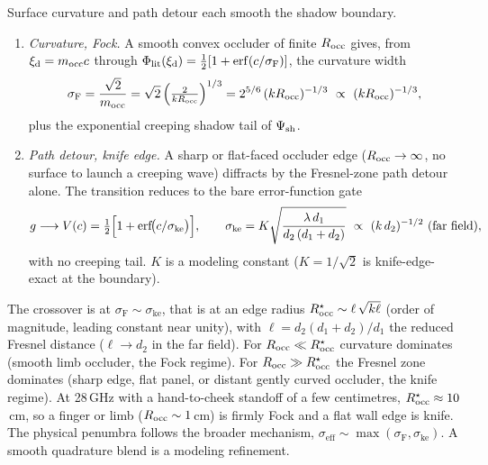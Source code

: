 \begin{proposition}\label{prop:knife}
Surface curvature and path detour each smooth the shadow boundary.
\begin{enumerate}
  \item \emph{Curvature, Fock.} A smooth convex occluder of finite $R_{\mathrm{occ}}$ gives,
    from $\xi_{\mathrm d}=m_{\mathrm{occ}}c$ through
    $\Philit(\xi_{\mathrm d})=\half[1+\erf(\clr/\sigma_{\mathrm{F}})]$, the
    curvature width
    \begin{equation}\label{eq:sigma-fock}
      \sigma_{\mathrm{F}} = \frac{\sqrt2}{m_{\mathrm{occ}}}
      = \sqrt2\,\Bigl(\tfrac{2}{kR_{\mathrm{occ}}}\Bigr)^{1/3}
      = 2^{5/6}\,(kR_{\mathrm{occ}})^{-1/3}
      \ \propto\ (kR_{\mathrm{occ}})^{-1/3},
    \end{equation}
    plus the exponential creeping shadow tail of $\Psi_{\mathrm{sh}}$.
  \item \emph{Path detour, knife edge.} A sharp or flat-faced occluder edge
    ($R_{\mathrm{occ}}\to\infty$, no surface to launch a creeping wave) diffracts by the
    Fresnel-zone path detour alone. The transition reduces to the bare
    error-function gate
    \begin{equation}\label{eq:knife-gate}
      g \longrightarrow V(\clr) = \half\Bigl[1+\erf\!\bigl(\clr/\sigma_{\mathrm{ke}}\bigr)\Bigr],
      \qquad
      \sigma_{\mathrm{ke}} = K\sqrt{\frac{\lambda\,d_1}{d_2\,(d_1+d_2)}}
      \ \propto\ (k\,d_2)^{-1/2}\ \text{(far field)},
    \end{equation}
    with no creeping tail. $K$ is a modeling constant ($K=1/\sqrt2$ is
    knife-edge-exact at the boundary).
\end{enumerate}
The crossover is at $\sigma_{\mathrm{F}}\sim\sigma_{\mathrm{ke}}$, that is at an
edge radius $R_{\mathrm{occ}}^\star\sim \ell\,\sqrt{k\ell}$ (order of magnitude, leading
constant near unity), with $\ell=d_2(d_1+d_2)/d_1$ the reduced Fresnel distance
($\ell\to d_2$ in the far field). For $R_{\mathrm{occ}}\ll R_{\mathrm{occ}}^\star$ curvature dominates
(smooth limb occluder, the Fock regime). For $R_{\mathrm{occ}}\gg R_{\mathrm{occ}}^\star$ the Fresnel
zone dominates (sharp edge, flat panel, or distant gently curved occluder, the
knife regime). At 28\,GHz with a hand-to-cheek standoff of a few centimetres,
$R_{\mathrm{occ}}^\star\approx 10$\,cm, so a finger or limb ($R_{\mathrm{occ}}\sim1$\,cm) is firmly Fock
and a flat wall edge is knife. The physical penumbra follows the broader
mechanism, $\sigma_{\mathrm{eff}}\sim\max(\sigma_{\mathrm{F}},\sigma_{\mathrm{ke}})$.
A smooth quadrature blend is a modeling refinement.
\end{proposition}

